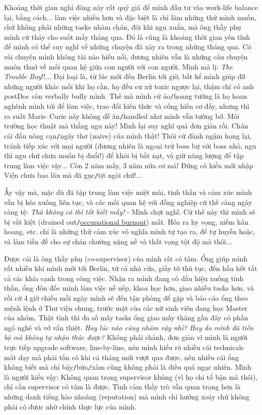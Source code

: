 \documentclass[12pt]{article}
\numberwithin{equation}{section}
\begin{document}
\noindent
{} Khoảng thời gian nghỉ đông này rất quý giá để mình đầu tư vào work-life balance lại, bằng cách$\ldots$ làm việc nhiều hơn và đặc biệt là chỉ làm những thứ mình muốn, chứ không phải những tasks nhàm chán, đôi khi ngu xuẩn, mà ông thầy phụ mình cứ thảy cho suốt mấy tháng qua. Đó là cũng là khoảng thời gian yên tĩnh để mình có thể suy nghĩ về những chuyện đã xảy ra trong những tháng qua. Có vài chuyện mình không tài nào hiểu nổi, đương nhiên vẫn là những câu chuyện muôn thuở về mối quan hệ giữa con người với con người. Mình mà lị: \textit{The Trouble Boy}!!$\ldots$ Đại loại là, từ lúc mới đến Berlin tới giờ, bất kể mình giúp đỡ những người khác mỗi khi họ cần, họ đều cư xử toxic ngược lại, thậm chí có anh postDoc còn verbally bully mình. Thế mà mình cứ ảo\texttt{/}hoang tưởng là họ hoan nghênh mình tới để làm việc, trao đổi kiến thức và cống hiến cơ đấy, nhưng thì ra suất Marie--Curie này không dễ ăn\texttt{/}handled như mình vẫn tưởng bở. Môi trường học thuật mà thằng ngu này! Mình lại suy nghĩ quá đơn giản rồi. Chán cái đầu nông cạn\texttt{/}ngây thơ (naive) của mình thật! Thôi cứ đành ngậm họng lại, tránh tiếp xúc với mọi người (đương nhiên là ngoại trừ boss bự với boss nhỏ, ngu thì ngu chứ chưa muốn bị đuổi!) để khỏi bị bắt nạt, và giữ năng lượng để tập trung làm việc vậy$\ldots$ Còn 2 năm mấy, 3 năm nữa cơ mà! Đừng có kiểu mới nhập Viện chưa bao lâu mà đã gục\texttt{/}tịt ngòi chứ!$\ldots$

Ấy vậy mà, mặc dù đã tập trung làm việc miệt mài, tinh thần và cảm xúc mình vẫn bị kéo xuống liên tục, và các mối quan hệ với đồng nghiệp cứ thế càng ngày càng tệ: \textit{Thà không có thì tốt biết mấy!} - Mình chợt nghĩ. Cứ thế này thì mình sẽ bị vắt kiệt (drained out\texttt{/}\href{https://en.wikipedia.org/wiki/Occupational_burnout}{occupational burnout}) mất. Hóa ra hy vọng, niềm hân hoang, etc. chỉ là những thứ cảm xúc vô nghĩa mình tự tạo ra, để tự huyễn hoặc, và làm tiền đề cho sự chán chường nặng nề và thất vọng tột độ mà thôi$\ldots$

Được cái là ông thầy phụ (co-supervisor) của mình rất có tâm. Ổng giúp mình rất nhiều khi mình mới tới Berlin, từ cả nhà cửa, giấy tờ thủ tục, đến hầu hết tất cả các khía cạnh trong công việc. Nhận ra mình đang có dấu hiệu xuống tinh thần, ổng đôn đốc mình làm việc nề nếp, khoa học hơn, giao nhiều tasks hơn, và rồi cứ 4 giờ chiều mỗi ngày mình sẽ đến tận phòng để gặp và báo cáo ổng theo mệnh lệnh ở Thư viện chung, trước mặt của các nữ sinh viên đang học Master của nhóm. Thật tình thì đa số mấy tasks ổng giao mấy tháng gần đây có phần ngô nghê và vớ vẩn thiệt. \textit{Hay lúc nào cũng nhảm vậy nhỉ? Hay do mình đã tiến bộ mà không tự nhận thức được?} Không phải chảnh, đơn giản vì mình là người trực tiếp upgrade software, line-by-line, nên mình hiểu rõ nhiều cái technicals mất dạy mà phải tốn có khi cả tháng mới vượt qua được, nên nhiều cái ổng không biết mà chỉ bậy\texttt{/}bừa\texttt{/}xàm cũng không phải là điều quá ngạc nhiên. Mình là người kiểu vậy: Không quan trọng supervisor khủng (vì họ chỉ tổ bận mà thôi), chỉ cần supervisor có tâm là được. Tình cảm thầy trò vẫn quan trọng hơn là những danh tiếng hào nhoáng (reputation) mà mình chỉ hưởng xoáy chứ không phải có được nhờ chính thực lực của mình.
\end{document}

